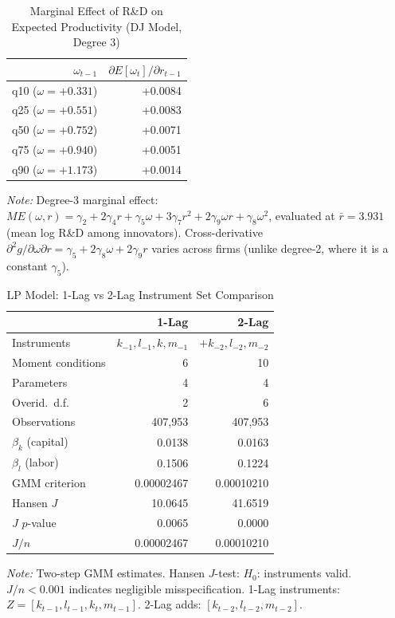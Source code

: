 \documentclass[a4paper, 12pt]{article}
\begin{document}
\begin{table}[htbp]
\centering
\caption{Marginal Effect of R\&D on Expected Productivity (DJ Model, Degree 3)}
\label{tab:dj_marginal}
\begin{tabular}{rr}
\toprule
$\omega_{t-1}$ & $\partial E[\omega_t] / \partial r_{t-1}$ \\
\midrule
  q10 ($\omega = +0.331$) & +0.0084 \\
  q25 ($\omega = +0.551$) & +0.0083 \\
  q50 ($\omega = +0.752$) & +0.0071 \\
  q75 ($\omega = +0.940$) & +0.0051 \\
  q90 ($\omega = +1.173$) & +0.0014 \\
\bottomrule
\end{tabular}
\begin{flushleft}
\footnotesize
\textit{Note:} Degree-3 marginal effect:
$ME(\omega, r) = \gamma_2 + 2\gamma_4 r + \gamma_5 \omega + 3\gamma_7 r^2 + 2\gamma_9 \omega r + \gamma_8 \omega^2$,
evaluated at $\bar{r} = 3.931$ (mean log R\&D among innovators).
Cross-derivative $\partial^2 g / \partial\omega\partial r = \gamma_5 + 2\gamma_8\omega + 2\gamma_9 r$
varies across firms (unlike degree-2, where it is a constant $\gamma_5$).
\end{flushleft}
\end{table}

\begin{table}[htbp]
\centering
\caption{LP Model: 1-Lag vs 2-Lag Instrument Set Comparison}
\label{tab:lp_lag}
\begin{tabular}{lrr}
\toprule
 & 1-Lag & 2-Lag \\
\midrule
Instruments & $k_{-1}, l_{-1}, k, m_{-1}$ & $+ k_{-2}, l_{-2}, m_{-2}$ \\
Moment conditions & 6 & 10 \\
Parameters & 4 & 4 \\
Overid.\ d.f. & 2 & 6 \\
Observations & 407,953 & 407,953 \\
\midrule
$\beta_k$ (capital) & 0.0138 & 0.0163 \\
$\beta_l$ (labor) & 0.1506 & 0.1224 \\
\midrule
GMM criterion & 0.00002467 & 0.00010210 \\
Hansen $J$ & 10.0645 & 41.6519 \\
$J$ $p$-value & 0.0065 & 0.0000 \\
$J/n$ & 0.00002467 & 0.00010210 \\
\bottomrule
\end{tabular}
\begin{flushleft}
\footnotesize
\textit{Note:} Two-step GMM estimates. Hansen $J$-test: $H_0$: instruments valid.
$J/n < 0.001$ indicates negligible misspecification.
1-Lag instruments: $Z = [k_{t-1}, l_{t-1}, k_t, m_{t-1}]$.
2-Lag adds: $[k_{t-2}, l_{t-2}, m_{t-2}]$.
\end{flushleft}
\end{table}
\end{document}
